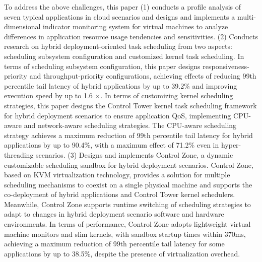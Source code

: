 To address the above challenges, this paper (1) conducts a profile analysis of seven typical applications in cloud scenarios and designs and implements a multi-dimensional indicator monitoring system for virtual machines to analyze differences in application resource usage tendencies and sensitivities. (2) Conducts research on hybrid deployment-oriented task scheduling from two aspects: scheduling subsystem configuration and customized kernel task scheduling. In terms of scheduling subsystem configuration, this paper designs responsiveness-priority and throughput-priority configurations, achieving effects of reducing 99th percentile tail latency of hybrid applications by up to 39.2\% and improving execution speed by up to 1.6 $\times$. In terms of customizing kernel scheduling strategies, this paper designs the Control Tower kernel task scheduling framework for hybrid deployment scenarios to ensure application QoS, implementing CPU-aware and network-aware scheduling strategies. The CPU-aware scheduling strategy achieves a maximum reduction of 99th percentile tail latency for hybrid applications by up to 90.4\%, with a maximum effect of 71.2\% even in hyper-threading scenarios. (3) Designs and implements Control Zone, a dynamic customizable scheduling sandbox for hybrid deployment scenarios. Control Zone, based on KVM virtualization technology, provides a solution for multiple scheduling mechanisms to coexist on a single physical machine and supports the co-deployment of hybrid applications and Control Tower kernel schedulers. Meanwhile, Control Zone supports runtime switching of scheduling strategies to adapt to changes in hybrid deployment scenario software and hardware environments. In terms of performance, Control Zone adopts lightweight virtual machine monitors and slim kernels, with sandbox startup times within 370ms, achieving a maximum reduction of 99th percentile tail latency for some applications by up to 38.5\%, despite the presence of virtualization overhead.



\pagestyle{enfrontmatterstyle}%
\cleardoublepage\pagestyle{frontmatterstyle}%

